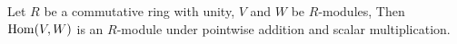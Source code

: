 \begin{proposition}
  Let
    $R$ be a commutative ring with unity,
    $V$ and $W$ be $R$-modules,
  Then $\mathop{\rm Hom}\nolimits(V, W)$ is an $R$-module under pointwise addition and scalar
  multiplication.
\end{proposition}
